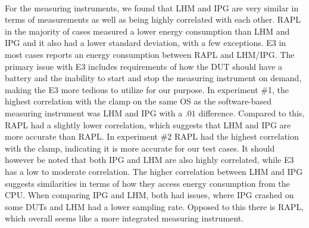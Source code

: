 \paragraph*{}
For the measuring instruments, we found that LHM and IPG are very similar in terms of measurements as well as being highly correlated with each other. RAPL in the majority of cases measured a lower energy consumption than LHM and IPG and it also had a lower standard deviation, with a few exceptions. E3 in most cases reports an energy consumption between RAPL and LHM/IPG. The primary issue with E3 includes requirements of how the DUT should have a battery and the inability to start and stop the measuring instrument on demand, making the E3 more tedious to utilize for our purpose. In experiment \#1, the highest correlation with the clamp on the same OS as the software-based measuring instrument was LHM and IPG with a $.01$ difference. Compared to this, RAPL had a slightly lower correlation, which suggests that LHM and IPG are more accurate than RAPL. In experiment \#2 RAPL had the highest correlation with the clamp, indicating it is more accurate for our test cases. It should however be noted that both IPG and LHM are also highly correlated, while E3 has a low to moderate correlation. The higher correlation between LHM and IPG suggests similarities in terms of how they access energy consumption from the CPU. When comparing IPG and LHM, both had issues, where IPG crashed on some DUTs and LHM had a lower sampling rate. Opposed to this there is RAPL, which overall seems like a more integrated measuring instrument.
